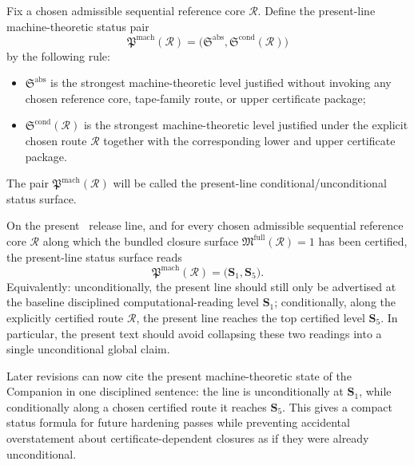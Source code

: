 \begin{definition}
Fix a chosen admissible sequential reference core \(\mathcal R\). Define the present-line machine-theoretic status pair
\[
\mathfrak P^{\mathrm{mach}}(\mathcal R)=\bigl(\mathfrak S^{\mathrm{abs}},\mathfrak S^{\mathrm{cond}}(\mathcal R)\bigr)
\]
by the following rule:
\begin{itemize}[leftmargin=2em]
 \item \(\mathfrak S^{\mathrm{abs}}\) is the strongest machine-theoretic level justified without invoking any chosen reference core, tape-family route, or upper certificate package;
 \item \(\mathfrak S^{\mathrm{cond}}(\mathcal R)\) is the strongest machine-theoretic level justified under the explicit chosen route \(\mathcal R\) together with the corresponding lower and upper certificate package.
\end{itemize}
The pair \(\mathfrak P^{\mathrm{mach}}(\mathcal R)\) will be called the present-line conditional/unconditional status surface.
\end{definition}

\begin{proposition}
On the present \docversion\ release line, and for every chosen admissible sequential reference core \(\mathcal R\) along which the bundled closure surface \(\mathfrak M^{\mathrm{full}}(\mathcal R)=1\) has been certified, the present-line status surface reads
\[
\mathfrak P^{\mathrm{mach}}(\mathcal R)=\bigl(\mathbf S_1,\mathbf S_5\bigr).
\]
Equivalently: unconditionally, the present line should still only be advertised at the baseline disciplined computational-reading level \(\mathbf S_1\); conditionally, along the explicitly certified route \(\mathcal R\), the present line reaches the top certified level \(\mathbf S_5\). In particular, the present text should avoid collapsing these two readings into a single unconditional global claim.
\end{proposition}

\begin{corollary}
Later revisions can now cite the present machine-theoretic state of the Companion in one disciplined sentence: the line is unconditionally at \(\mathbf S_1\), while conditionally along a chosen certified route it reaches \(\mathbf S_5\). This gives a compact status formula for future hardening passes while preventing accidental overstatement about certificate-dependent closures as if they were already unconditional.
\end{corollary}


